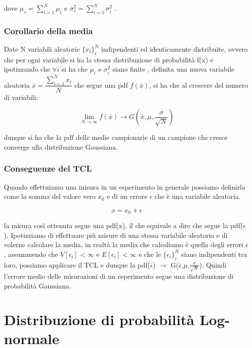 dove $\mu_s =\sum_{i=1}^N \mu_i$ e $\sigma_s^2 = \sum_{i=1}^N \sigma^2_i$ .

\subsubsection{Corollario della media}

Date N variabili aleatorie $\{x_{i}\}_{i}^N$ indipendenti ed identicamente distribuite, ovvero che per ogni variabile si ha la stessa distribuzione di probabilit\`{a} f(x) e ipotizzando che $\forall i$ si ha che $\mu_i$ e $\sigma_i^2$ siano finite , definita una nuova variabile aleatoria $\overline{x} = \dfrac{\sum_{i=1}^N x_{i}}{N}$ che segue una pdf $f(\overline{x})$, si ha che al crescere del numero di variabili:

\begin{equation*}
	\lim_{N \rightarrow \infty} f(\overline{x}) \rightarrow G(\overline{x},\mu,\frac{\sigma}{\sqrt{N}})
\end{equation*}

dunque si ha che la pdf delle medie campionarie di un campione che cresce converge alla distribuzione Gaussiana.


\subsubsection{Conseguenze del TCL}

 Quando effettuiamo una misura in un esperimento in generale possiamo definirla come la somma del valore vero $x_0$ e di un errore $\epsilon$ che \`{e} una variabile aleatoria.
 
 \begin{equation*}
 	x = x_0 + \epsilon
 \end{equation*}

la misura cos\`{i} ottenuta segue una pdf(x), il che equivale a dire che segue la pdf($\epsilon$). Ipotizziamo di effettuare pi\`{u} misure di una stessa variabile aleatoria e di volerne calcolare la media, in realt\`{a} la media che calcoliamo \`{e} quella degli errori $\epsilon$, assummendo che $V[\epsilon_i] < \infty$ e $E[\epsilon_i] < \infty$ e che le $\{\epsilon_i\}_{i}^N$ siano indipendenti tra loro, possiamo applicare il TCL e dunque la  pdf($\overline{\epsilon}$) $\rightarrow$ G($\overline{\epsilon}$,$\mu$,$\frac{\sigma}{\sqrt{N}}$). Quindi l'errore medio delle misurazioni di un esperimento segue una distribuzione di probabilit\`{a} Gaussiana.

\section{Distribuzione di probabilit\`{a} Log-normale}

